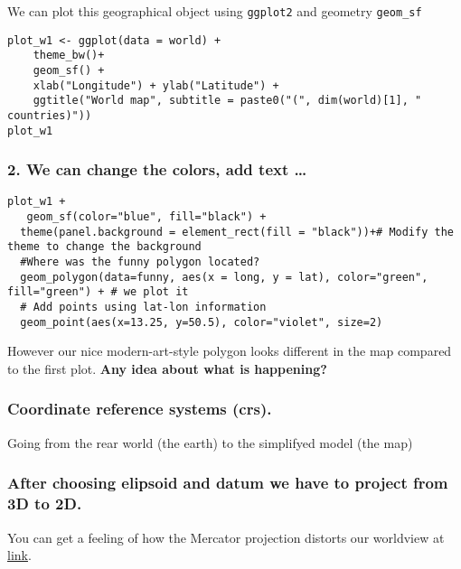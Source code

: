 \documentclass[
]{book}
\theoremstyle{definition}
\theoremstyle{definition}
\theoremstyle{definition}
\theoremstyle{definition}
\theoremstyle{remark}
\begin{document}
We can plot this geographical object using \texttt{ggplot2} and geometry \texttt{geom\_sf}

\begin{verbatim}
plot_w1 <- ggplot(data = world) +
    theme_bw()+ 
    geom_sf() + 
    xlab("Longitude") + ylab("Latitude") + 
    ggtitle("World map", subtitle = paste0("(", dim(world)[1], " countries)"))
plot_w1
\end{verbatim}

\hypertarget{we-can-change-the-colors-add-text}{%
\subsubsection{2. We can change the colors, add text \ldots{}}\label{we-can-change-the-colors-add-text}}

\begin{verbatim}
plot_w1 +
   geom_sf(color="blue", fill="black") +
  theme(panel.background = element_rect(fill = "black"))+# Modify the theme to change the background 
  #Where was the funny polygon located?
  geom_polygon(data=funny, aes(x = long, y = lat), color="green", fill="green") + # we plot it
  # Add points using lat-lon information
  geom_point(aes(x=13.25, y=50.5), color="violet", size=2)
\end{verbatim}

However our nice modern-art-style polygon looks different in the map compared to the first plot. \textbf{Any idea about what is happening?}

\hypertarget{coordinate-reference-systems-crs.}{%
\subsubsection{Coordinate reference systems (crs).}\label{coordinate-reference-systems-crs.}}

Going from the rear world (the earth) to the simplifyed model (the map)

\hypertarget{after-choosing-elipsoid-and-datum-we-have-to-project-from-3d-to-2d.}{%
\subsubsection{After choosing elipsoid and datum we have to project from 3D to 2D.}\label{after-choosing-elipsoid-and-datum-we-have-to-project-from-3d-to-2d.}}

You can get a feeling of how the Mercator projection distorts our worldview at \href{https://thetruesize.com}{link}.
\end{document}
